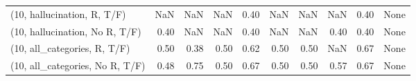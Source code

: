 \begin{table*}[h!]
\begin{adjustbox}{width=2\columnwidth,center}
\begin{tabular}{lrrr|rrr|rrr}
(10, hallucination, R, T/F)           &                       NaN &                   NaN &                       NaN &                          0.40 &                       NaN &                           NaN &                                    NaN &                               0.40 &                                  None \\
(10, hallucination, No R, T/F)        &                      0.40 &                   NaN &                       NaN &                          0.40 &                       NaN &                           NaN &                                   0.40 &                               0.40 &                                  None \\
(10, all\_categories, R, T/F)          &                      0.50 &                  0.38 &                      0.50 &                          0.62 &                      0.50 &                          0.50 &                                    NaN &                               0.67 &                                  None \\
(10, all\_categories, No R, T/F)       &                      0.48 &                  0.75 &                      0.50 &                          0.67 &                      0.50 &                          0.50 &                                   0.57 &                               0.67 &                                  None \\




\end{tabular}
\end{adjustbox}
\end{table*}

